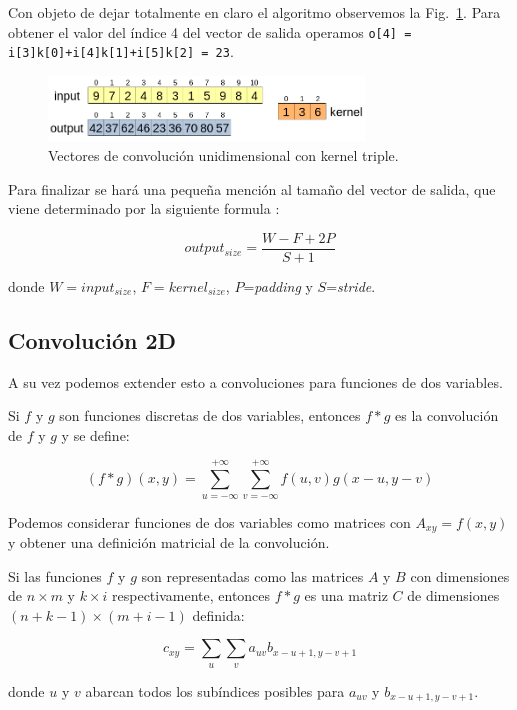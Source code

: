 \documentclass[a4paper,12pt]{article}
\begin{document}
Con objeto de dejar totalmente en claro el algoritmo observemos la Fig.~\ref{fig:conv1dk3}. Para obtener el valor del índice 4 del vector de salida operamos \texttt{o[4] = i[3]k[0]+i[4]k[1]+i[5]k[2] = 23}.

\begin{figure}[H]
	\begin{center}				
	\includegraphics[width=0.75\textwidth]{tesis_26.png}
  	\caption{Vectores de convolución unidimensional con kernel triple.}
  	\label{fig:conv1dk3}
  	\end{center}
\end{figure}

Para finalizar se hará una pequeña mención al tamaño del vector de salida, que viene determinado por la siguiente formula \citep{SOOutputConv}:

$$ output_{size} = \frac{W-F+2P}{S+1}$$

donde $W = input_{size}$, $F=kernel_{size}$, $P$=\textit{padding} y $S$=\textit{stride}.

\subsection{Convolución 2D}

A su vez podemos extender esto a convoluciones para funciones de dos variables.

Si $f$ y $g$ son funciones discretas de dos variables, entonces $f*g$ es la convolución de $f$ y $g$ y se define:

$$
(f*g)(x,y) = \sum_{u=-\infty}^{+\infty} \sum_{v=-\infty}^{+\infty} f(u,v)g(x-u,y-v)
$$

Podemos considerar funciones de dos variables como matrices con $A_{xy} = f(x,y)$ y obtener una definición matricial de la convolución.

Si las funciones $f$ y $g$ son representadas como las matrices $A$ y $B$ con dimensiones de $n \times m$ y $k \times i$ respectivamente, entonces $f*g$ es una matriz $C$ de dimensiones $(n+k-1) \times (m+i-1)$ definida:

$$
c_{xy} = \sum_{u} \sum_{v} a_{uv} b_{x-u+1,y-v+1}
$$

donde $u$ y $v$ abarcan todos los subíndices posibles para $a_{uv}$ y $b_{x-u+1,y-v+1}$.
\end{document}

